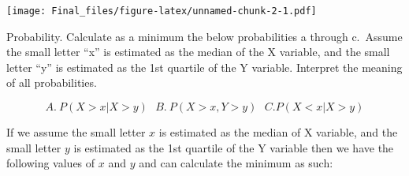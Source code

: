 \documentclass[
]{article}
\newenvironment{Shaded}{\begin{snugshade}}{\end{snugshade}}
\newcommand{\KeywordTok}[1]{\textcolor[rgb]{0.13,0.29,0.53}{\textbf{#1}}}
\newcommand{\NormalTok}[1]{#1}
\newcommand{\OperatorTok}[1]{\textcolor[rgb]{0.81,0.36,0.00}{\textbf{#1}}}
\begin{document}
\begin{Shaded}
\end{Shaded}

\texttt{[image: Final\_files/figure-latex/unnamed-chunk-2-1.pdf]}

Probability. Calculate as a minimum the below probabilities a through
c.~Assume the small letter ``x'' is estimated as the median of the X
variable, and the small letter ``y'' is estimated as the 1st quartile of
the Y variable. Interpret the meaning of all probabilities.

\[A. \ P(X>x | X>y) \hspace{8pt} B. \ P(X>x, Y>y) \hspace{8pt} C. P(X<x | X>y)\]

If we assume the small letter \(x\) is estimated as the median of X
variable, and the small letter \(y\) is estimated as the 1st quartile of
the Y variable then we have the following values of \(x\) and \(y\) and
can calculate the minimum as such:
\end{document}
